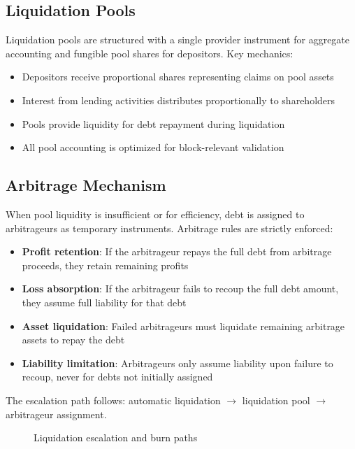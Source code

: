 \documentclass[11pt,a4paper]{article}
\begin{document}
\subsection{Liquidation Pools}
Liquidation pools are structured with a single provider instrument for aggregate accounting and fungible pool shares for depositors. Key mechanics:
\begin{itemize}
\item Depositors receive proportional shares representing claims on pool assets
\item Interest from lending activities distributes proportionally to shareholders
\item Pools provide liquidity for debt repayment during liquidation
\item All pool accounting is optimized for block-relevant validation
\end{itemize}

\subsection{Arbitrage Mechanism}
When pool liquidity is insufficient or for efficiency, debt is assigned to arbitrageurs as temporary instruments. Arbitrage rules are strictly enforced:

\begin{itemize}
\item \textbf{Profit retention}: If the arbitrageur repays the full debt from arbitrage proceeds, they retain remaining profits
\item \textbf{Loss absorption}: If the arbitrageur fails to recoup the full debt amount, they assume full liability for that debt
\item \textbf{Asset liquidation}: Failed arbitrageurs must liquidate remaining arbitrage assets to repay the debt
\item \textbf{Liability limitation}: Arbitrageurs only assume liability upon failure to recoup, never for debts not initially assigned
\end{itemize}

The escalation path follows: automatic liquidation $\rightarrow$ liquidation pool $\rightarrow$ arbitrageur assignment.

\begin{figure}[H]
\centering
{}
\caption{Liquidation escalation and burn paths}
\label{fig:liquidation}
\end{figure}
\end{document}
